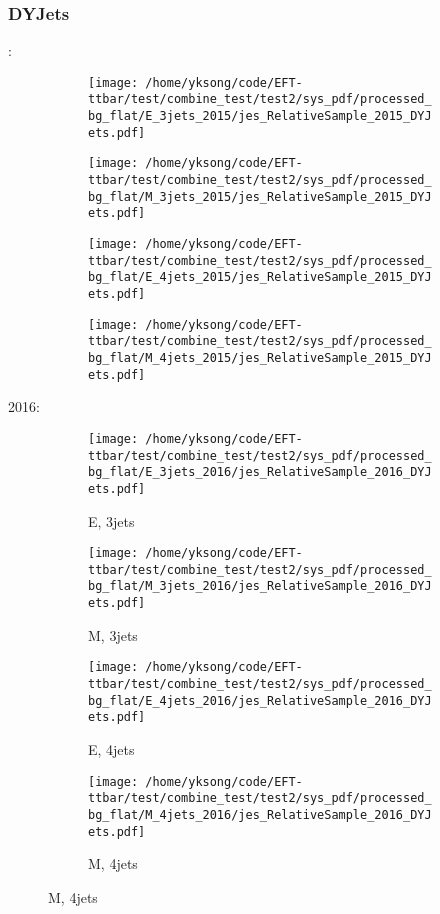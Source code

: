 \documentclass{beamer}
\begin{document}
\begin{frame}
\frametitle{DYJets}
\fontsize{5}{1}:
\begin{figure}
\centering
\begin{subfigure}[b]{0.24\textwidth}
\texttt{[image: /home/yksong/code/EFT-ttbar/test/combine\_test/test2/sys\_pdf/processed\_bg\_flat/E\_3jets\_2015/jes\_RelativeSample\_2015\_DYJets.pdf]}
\end{subfigure}
\begin{subfigure}[b]{0.24\textwidth}
\texttt{[image: /home/yksong/code/EFT-ttbar/test/combine\_test/test2/sys\_pdf/processed\_bg\_flat/M\_3jets\_2015/jes\_RelativeSample\_2015\_DYJets.pdf]}
\end{subfigure}
\begin{subfigure}[b]{0.24\textwidth}
\texttt{[image: /home/yksong/code/EFT-ttbar/test/combine\_test/test2/sys\_pdf/processed\_bg\_flat/E\_4jets\_2015/jes\_RelativeSample\_2015\_DYJets.pdf]}
\end{subfigure}
\begin{subfigure}[b]{0.24\textwidth}
\texttt{[image: /home/yksong/code/EFT-ttbar/test/combine\_test/test2/sys\_pdf/processed\_bg\_flat/M\_4jets\_2015/jes\_RelativeSample\_2015\_DYJets.pdf]}
\end{subfigure}
\end{figure}
2016:
\begin{figure}
\centering
\begin{subfigure}[b]{0.24\textwidth}
\texttt{[image: /home/yksong/code/EFT-ttbar/test/combine\_test/test2/sys\_pdf/processed\_bg\_flat/E\_3jets\_2016/jes\_RelativeSample\_2016\_DYJets.pdf]}
\captionsetup{font=tiny}
\caption{E, 3jets}
\end{subfigure}
\begin{subfigure}[b]{0.24\textwidth}
\texttt{[image: /home/yksong/code/EFT-ttbar/test/combine\_test/test2/sys\_pdf/processed\_bg\_flat/M\_3jets\_2016/jes\_RelativeSample\_2016\_DYJets.pdf]}
\captionsetup{font=tiny}
\caption{M, 3jets}
\end{subfigure}
\begin{subfigure}[b]{0.24\textwidth}
\texttt{[image: /home/yksong/code/EFT-ttbar/test/combine\_test/test2/sys\_pdf/processed\_bg\_flat/E\_4jets\_2016/jes\_RelativeSample\_2016\_DYJets.pdf]}
\captionsetup{font=tiny}
\caption{E, 4jets}
\end{subfigure}
\begin{subfigure}[b]{0.24\textwidth}
\texttt{[image: /home/yksong/code/EFT-ttbar/test/combine\_test/test2/sys\_pdf/processed\_bg\_flat/M\_4jets\_2016/jes\_RelativeSample\_2016\_DYJets.pdf]}
\captionsetup{font=tiny}
\caption{M, 4jets}
\end{subfigure}
\end{figure}
\end{frame}
\end{document}
